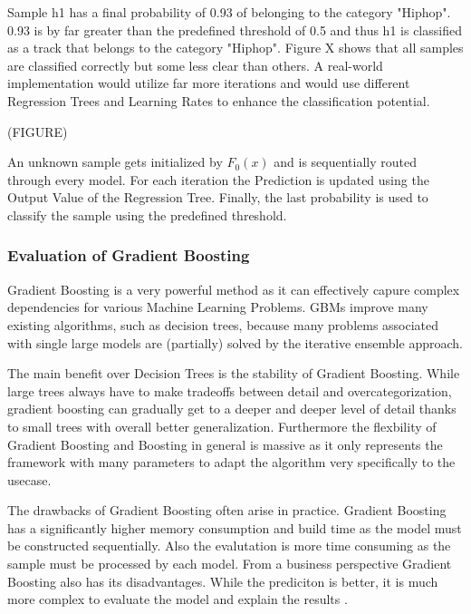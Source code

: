 Sample h1 has a final probability of 0.93 of belonging to the category "Hiphop". 0.93 is by far greater than the 
predefined threshold of 0.5 and thus h1 is classified as a track that belongs to the category "Hiphop". Figure X shows
that all samples are classified correctly but some less clear than others. A real-world implementation would utilize far
more iterations and would use different Regression Trees and Learning Rates to enhance the classification potential. 

(FIGURE)

An unknown sample gets initialized by \(F_{0}(x)\) and is sequentially routed through every model. For each iteration the 
Prediction is updated using the Output Value of the Regression Tree. Finally, the last probability is used to classify 
the sample using the predefined threshold. 

\subsubsection{Evaluation of Gradient Boosting}

Gradient Boosting is a very powerful method as it can effectively capure complex dependencies for various Machine 
Learning Problems. GBMs improve many existing algorithms, such as decision trees, because many problems associated 
with single large models are (partially) solved by the iterative ensemble approach. 

The main benefit over Decision Trees is the stability of Gradient Boosting. While large trees always have to make tradeoffs 
between detail and overcategorization, gradient boosting can gradually get to a deeper and deeper level of detail thanks to 
small trees with overall better generalization. Furthermore the flexbility of Gradient Boosting and Boosting in general is massive 
as it only represents the framework with many parameters to adapt the algorithm very specifically to the usecase.  

The drawbacks of Gradient Boosting often arise in practice. Gradient Boosting has a significantly higher memory consumption and 
build time as the model must be constructed sequentially. Also the evalutation is more time consuming as the sample must be processed 
by each model. From a business perspective Gradient Boosting also has its disadvantages. While the prediciton is better, it is much 
more complex to evaluate the model and explain the results \cite[7.2]{Natekin2013}. 